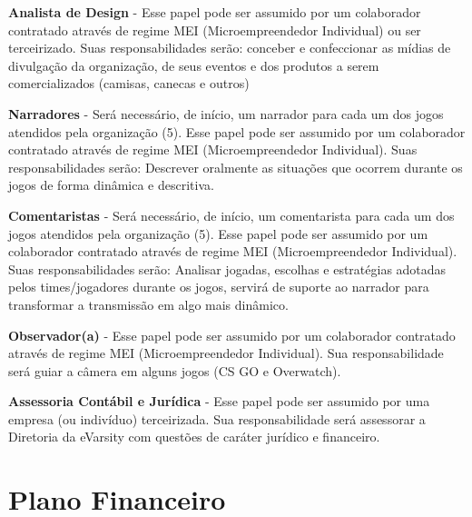 \documentclass[a4paper, 12pt]{paper}
\begin{document}
\textbf{Analista de Design} - Esse papel pode ser assumido por um colaborador contratado através de regime MEI (Microempreendedor Individual) ou ser terceirizado. Suas responsabilidades serão: conceber e confeccionar as mídias de divulgação da organização, de seus eventos e dos produtos a serem comercializados (camisas, canecas e outros)

\textbf{Narradores} - Será necessário, de início, um narrador para cada um dos jogos atendidos pela organização (5). Esse papel pode ser assumido por um colaborador contratado através de regime MEI (Microempreendedor Individual). Suas responsabilidades serão: Descrever oralmente as situações que ocorrem durante os jogos de forma dinâmica e descritiva.

\textbf{Comentaristas} - Será necessário, de início, um comentarista para cada um dos jogos atendidos pela organização (5). Esse papel pode ser assumido por um colaborador contratado através de regime MEI (Microempreendedor Individual). Suas responsabilidades serão: Analisar jogadas, escolhas e estratégias adotadas pelos times/jogadores durante os jogos, servirá de suporte ao narrador para transformar a transmissão em algo mais dinâmico.

\textbf{Observador(a)} -  Esse papel pode ser assumido por um colaborador contratado através de regime MEI (Microempreendedor Individual). Sua responsabilidade será guiar a câmera em alguns jogos (CS GO e Overwatch).

\textbf{Assessoria Contábil e Jurídica} - Esse papel pode ser assumido por uma empresa (ou indivíduo) terceirizada. Sua responsabilidade será assessorar a Diretoria da eVarsity com questões de caráter jurídico e financeiro.

\newpage
\section{Plano Financeiro}
\end{document}
